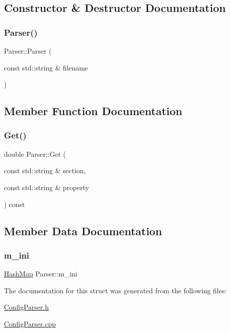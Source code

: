 \subsection{Constructor \& Destructor Documentation}
\mbox{\label{structParser_a08b991520305d80e16724648b862abec}} 
\subsubsection{\texorpdfstring{Parser()}{Parser()}}
{\footnotesize\ttfamily Parser\+::\+Parser (\begin{DoxyParamCaption}\item[{const std\+::string \&}]{filename }\end{DoxyParamCaption})}



\subsection{Member Function Documentation}
\mbox{\label{structParser_a8605ad3e2842cb575d18ea198e34440e}} 
\subsubsection{\texorpdfstring{Get()}{Get()}}
{\footnotesize\ttfamily double Parser\+::\+Get (\begin{DoxyParamCaption}\item[{const std\+::string \&}]{section,  }\item[{const std\+::string \&}]{property }\end{DoxyParamCaption}) const}



\subsection{Member Data Documentation}
\mbox{\label{structParser_a9fdee34c7149a81adc5eac9ca43da6bb}} 
\subsubsection{\texorpdfstring{m\+\_\+ini}{m\_ini}}
{\footnotesize\ttfamily \hyperlink{structParser_ad2a004120cee6141ddb88359cf15d16b}{Hash\+Map} Parser\+::m\+\_\+ini\hspace{0.3cm}{\ttfamily [private]}}



The documentation for this struct was generated from the following files\+:\begin{DoxyCompactItemize}
\item 
\hyperlink{ConfigParser_8h}{Config\+Parser.\+h}\item 
\hyperlink{ConfigParser_8cpp}{Config\+Parser.\+cpp}\end{DoxyCompactItemize}
